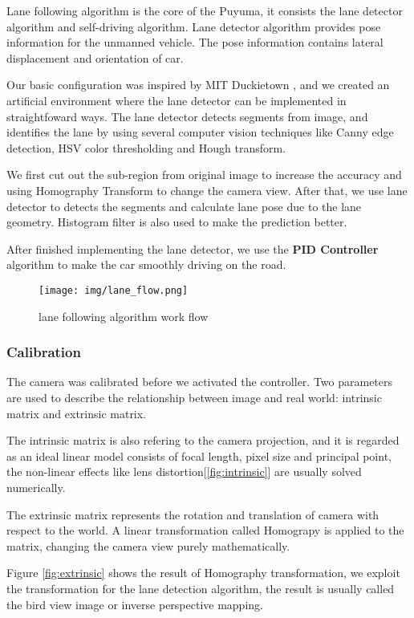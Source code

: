 \begin{spacing}{2.0}
Lane following algorithm is the core of the Puyuma, it consists the lane detector algorithm and self-driving algorithm. Lane detector algorithm provides pose information for the unmanned vehicle. The pose information contains lateral displacement and orientation of car.

Our basic configuration was inspired by MIT Duckietown \cite{Duckietown}, and we created an artificial environment where the lane detector can be implemented in straightfoward ways. The lane detector detects segments from image, and identifies the lane by using several computer vision techniques like Canny edge detection, HSV color thresholding and Hough transform.

We first cut out the sub-region from original image to increase the accuracy and using Homography Transform to change the camera view. After that, we use lane detector to detects the segments and calculate lane pose due to the lane geometry. Histogram filter is also used to make the prediction better. 

After finished implementing the lane detector, we use the \textbf{PID Controller} algorithm to make the car smoothly driving on the road.

\begin{figure}
	\centering
	\texttt{[image: img/lane\_flow.png]}
	\caption{lane following algorithm work flow}
	\label{fig:lane_following_flow}
\end{figure}

\subsubsection{Calibration}

The camera was calibrated before we activated the controller. Two parameters are used to describe the relationship between image and real world: intrinsic matrix and extrinsic matrix.

The intrinsic matrix is also refering to the camera projection, and it is regarded as an ideal linear model consists of focal length, pixel size and principal point, the non-linear effects like lens distortion[\ref{fig:intrinsic}] are usually solved numerically.

The extrinsic matrix represents the rotation and translation of camera with respect to the world. A linear transformation called Homograpy is applied to the matrix, changing the camera view purely mathematically.

Figure \ref{fig:extrinsic} shows the result of Homography transformation, we exploit the transformation for the lane detection algorithm, the result is usually called the bird view image or inverse perspective mapping.


\end{spacing}
